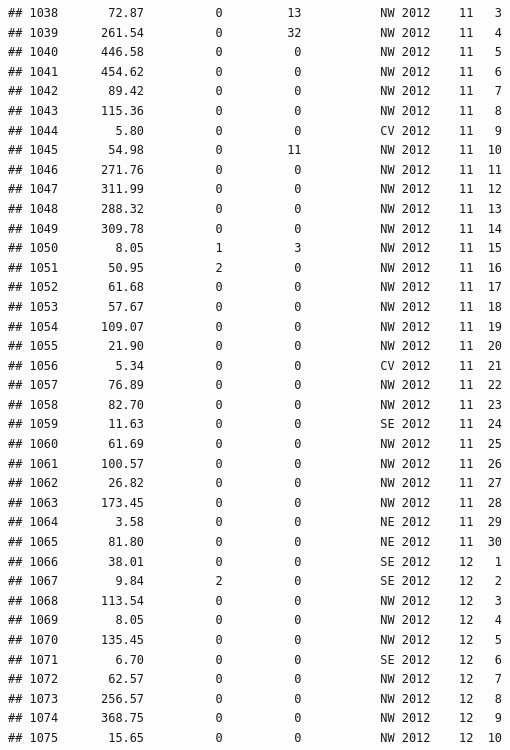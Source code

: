 \documentclass[
]{article}
\begin{document}
\begin{verbatim}
## 1038       72.87          0         13           NW 2012    11   3
## 1039      261.54          0         32           NW 2012    11   4
## 1040      446.58          0          0           NW 2012    11   5
## 1041      454.62          0          0           NW 2012    11   6
## 1042       89.42          0          0           NW 2012    11   7
## 1043      115.36          0          0           NW 2012    11   8
## 1044        5.80          0          0           CV 2012    11   9
## 1045       54.98          0         11           NW 2012    11  10
## 1046      271.76          0          0           NW 2012    11  11
## 1047      311.99          0          0           NW 2012    11  12
## 1048      288.32          0          0           NW 2012    11  13
## 1049      309.78          0          0           NW 2012    11  14
## 1050        8.05          1          3           NW 2012    11  15
## 1051       50.95          2          0           NW 2012    11  16
## 1052       61.68          0          0           NW 2012    11  17
## 1053       57.67          0          0           NW 2012    11  18
## 1054      109.07          0          0           NW 2012    11  19
## 1055       21.90          0          0           NW 2012    11  20
## 1056        5.34          0          0           CV 2012    11  21
## 1057       76.89          0          0           NW 2012    11  22
## 1058       82.70          0          0           NW 2012    11  23
## 1059       11.63          0          0           SE 2012    11  24
## 1060       61.69          0          0           NW 2012    11  25
## 1061      100.57          0          0           NW 2012    11  26
## 1062       26.82          0          0           NW 2012    11  27
## 1063      173.45          0          0           NW 2012    11  28
## 1064        3.58          0          0           NE 2012    11  29
## 1065       81.80          0          0           NE 2012    11  30
## 1066       38.01          0          0           SE 2012    12   1
## 1067        9.84          2          0           SE 2012    12   2
## 1068      113.54          0          0           NW 2012    12   3
## 1069        8.05          0          0           NW 2012    12   4
## 1070      135.45          0          0           NW 2012    12   5
## 1071        6.70          0          0           SE 2012    12   6
## 1072       62.57          0          0           NW 2012    12   7
## 1073      256.57          0          0           NW 2012    12   8
## 1074      368.75          0          0           NW 2012    12   9
## 1075       15.65          0          0           NW 2012    12  10

\end{verbatim}
\end{document}
